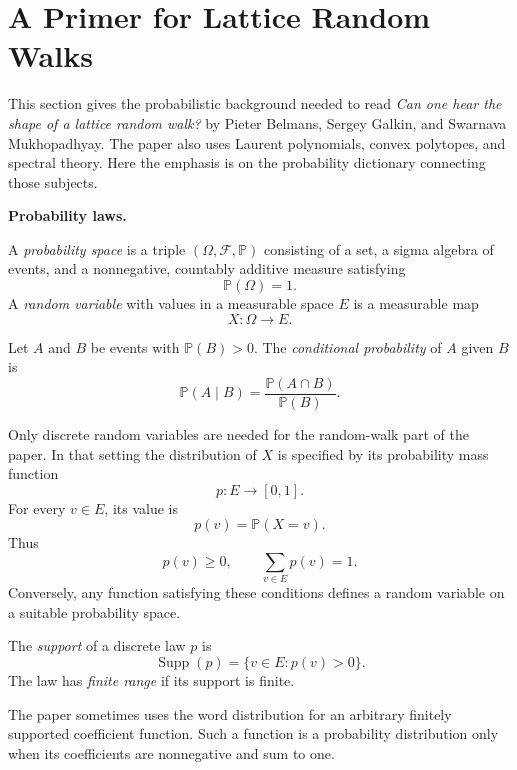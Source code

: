 \section{A Primer for Lattice Random Walks}
\label{section-primer-lattice-random-walks}

This section gives the probabilistic
background needed to read
\emph{Can one hear the shape of a lattice
random walk?} by Pieter Belmans, Sergey
Galkin, and Swarnava Mukhopadhyay. The
paper also uses Laurent polynomials,
convex polytopes, and spectral theory.
Here the emphasis is on the probability
dictionary connecting those subjects.

\medskip\noindent
{\bf Probability laws.}

\begin{definition}
\label{definition-probability-space}
A \emph{probability space} is a triple
$(\Omega,\mathcal F,\mathbb P)$ consisting
of a set, a sigma algebra of events, and a
nonnegative, countably additive measure
satisfying
$$
\mathbb P(\Omega)=1.
$$
A \emph{random variable} with values in a
measurable space $E$ is a measurable map
$$
X:\Omega\longrightarrow E.
$$
\end{definition}

\begin{definition}
\label{definition-conditional-probability}
Let $A$ and $B$ be events with
$\mathbb P(B)>0$. The \emph{conditional
probability} of $A$ given $B$ is
$$
\mathbb P(A\mid B)
=\frac{\mathbb P(A\cap B)}{\mathbb P(B)}.
$$
\end{definition}

Only discrete random variables are needed
for the random-walk part of the paper. In
that setting the distribution of $X$ is
specified by its probability mass function
$$
p:E\longrightarrow[0,1].
$$
For every $v\in E$, its value is
$$
p(v)=\mathbb P(X=v).
$$
Thus
$$
p(v)\geq 0,
\qquad
\sum_{v\in E}p(v)=1.
$$
Conversely, any function satisfying these
conditions defines a random variable on a
suitable probability space.

\begin{definition}
\label{definition-support-finite-range}
The \emph{support} of a discrete law $p$
is
$$
\operatorname{Supp}(p)
=\{v\in E:p(v)>0\}.
$$
The law has \emph{finite range} if its
support is finite.
\end{definition}

The paper sometimes uses the word
distribution for an arbitrary finitely
supported coefficient function. Such a
function is a probability distribution
only when its coefficients are
nonnegative and sum to one.

